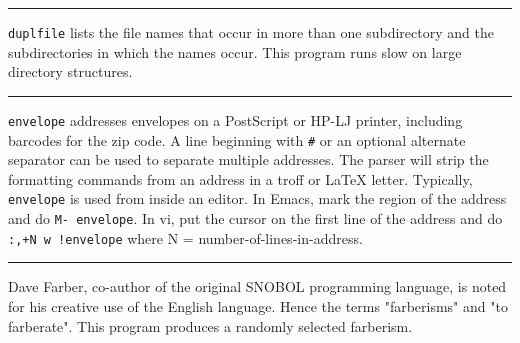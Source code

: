 {{{{{\vspace{0.25cm}\hrule{}

\texttt{duplfile} lists the file names that occur in more than one
subdirectory and the subdirectories in which the names occur. This
program runs slow on large directory structures.



\vspace{0.25cm}\hrule{}

\texttt{envelope} addresses envelopes on a PostScript
or HP-LJ printer, including barcodes for the zip code. A line beginning
with \texttt{\#} or an optional alternate separator can be used to
separate multiple addresses. The parser will strip the formatting
commands from an address in a troff or LaTeX letter. Typically,
\texttt{envelope} is used from inside an editor. In
Emacs, mark the region of the address and do \texttt{M-{\textbar}
envelope}. In vi, put the cursor on the first line of the address and
do \texttt{:,+N w !envelope} where N = number-of-lines-in-address.

\vspace{0.25cm}\hrule{}

Dave Farber, co-author of the original SNOBOL
programming language, is noted for his creative use of the English
language. Hence the terms "farberisms" and
"to farberate". This program produces a randomly selected farberism.

}}}}}

